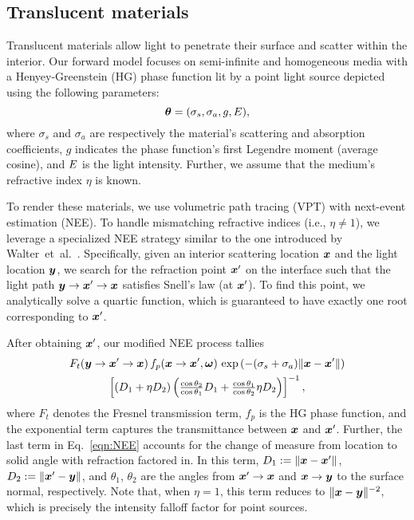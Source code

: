 \subsection{Translucent materials}
\label{ssec:scattering}
%
Translucent materials allow light to penetrate their surface and scatter within the interior.
Our forward model focuses on semi-infinite and homogeneous media with a Henyey-Greenstein (HG) phase function lit by a point light source depicted using the following parameters:
%
\[
\bm{\theta} = (\sigma_s, \sigma_a, g, E),
\]
%
where $\sigma_s$ and $\sigma_a$ are respectively the material's scattering and absorption coefficients, $g$ indicates the phase function's first Legendre moment (average cosine), and $E$ is the light intensity.
Further, we assume that the medium's refractive index $\eta$ is known.

To render these materials, we use volumetric path tracing (VPT) with next-event estimation (NEE).
To handle mismatching refractive indices (i.e., $\eta \neq 1$), we leverage a specialized NEE strategy similar to the one introduced by Walter~et~al.~.
Specifically, given an interior scattering location $\bm{x}$ and the light location $\bm{y}$, we search for the refraction point $\bm{x}'$ on the interface such that the light path $\bm{y} \to \bm{x}' \to \bm{x}$ satisfies Snell's law (at $\bm{x}'$).
To find this point, we analytically solve a quartic function, which is guaranteed to have exactly one root corresponding to $\bm{x}'$.

After obtaining $\bm{x}'$, our modified NEE process tallies
%
\begin{multline}
	\label{eqn:NEE}
	F_t(\bm{y} \to \bm{x}' \to \bm{x}) \, f_p(\bm{x} \to \bm{x}', \bm{\omega}) \, \exp\left(-(\sigma_s + \sigma_a) \| \bm{x} - \bm{x}' \|\right)\\
	\left[ (D_1 + \eta D_2) \left( \tfrac{\cos\theta_2}{\cos\theta_1}D_1 + \tfrac{\cos\theta_1}{\cos\theta_2} \eta D_2 \right) \right]^{-1},
\end{multline}
%
where $F_t$ denotes the Fresnel transmission term, $f_p$ is the HG phase function, and the exponential term captures the transmittance between $\bm{x}$ and $\bm{x}'$.
Further, the last term in Eq.~\eqref{eqn:NEE} accounts for the change of measure from location to solid angle with refraction factored in.
In this term, $D_1 := \| \bm{x} - \bm{x}' \|$, $D_2 := \| \bm{x}' - \bm{y} \|$, and $\theta_1$, $\theta_2$ are the angles from $\bm{x}' \to \bm{x}$ and $\bm{x} \to \bm{y}$ to the surface normal, respectively. %
Note that, when $\eta = 1$, this term reduces to $\| \bm{x} - \bm{y} \|^{-2}$, which is precisely the intensity falloff factor for point sources.


